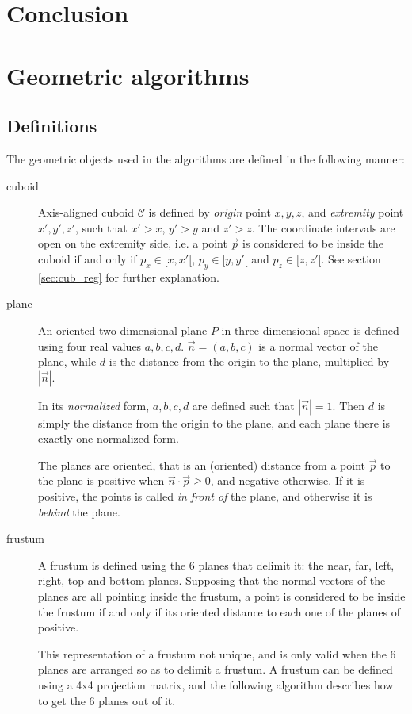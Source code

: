 \documentclass[a4paper,10pt,abstracton,notitlepage]{scrreprt}
\begin{document}
\chapter{Conclusion}

\appendix
\chapter{Geometric algorithms}

\section{Definitions}
The geometric objects used in the algorithms are defined in the following manner:
\begin{description}
\item[cuboid] Axis-aligned cuboid $\mathcal{C}$ is defined by \emph{origin} point $x, y, z$, and \emph{extremity} point $x', y', z'$, such that $x' > x$, $y' > y$ and $z' > z$. The coordinate intervals are open on the extremity side, i.e. a point $\overrightarrow{p}$ is considered to be inside the cuboid if and only if $p_{x} \in [x, x'[$, $p_{y} \in [y, y'[$ and $p_{z} \in [z, z'[$. See section \ref{sec:cub_reg} for further explanation.

\item[plane] An oriented two-dimensional plane $P$ in three-dimensional space is defined using four real values $a, b, c, d$. $\overrightarrow{n} = (a, b, c)$ is a normal vector of the plane, while $d$ is the distance from the origin to the plane, multiplied by $|\overrightarrow{n}|$.

In its \emph{normalized} form, $a, b, c, d$ are defined such that $|\overrightarrow{n}| = 1$. Then $d$ is simply the distance from the origin to the plane, and each plane there is exactly one normalized form.

The planes are oriented, that is an (oriented) distance from a point $\overrightarrow{p}$ to the plane is positive when $\overrightarrow{n} \cdot \overrightarrow{p} \geq 0$, and negative otherwise. If it is positive, the points is called \emph{in front of} the plane, and otherwise it is \emph{behind} the plane.

\item[frustum] A frustum is defined using the 6 planes that delimit it: the near, far, left, right, top and bottom planes. Supposing that the normal vectors of the planes are all pointing inside the frustum, a point is considered to be inside the frustum if and only if its oriented distance to each one of the planes of positive.

This representation of a frustum not unique, and is only valid when the 6 planes are arranged so as to delimit a frustum. A frustum can be defined using a 4x4 projection matrix, and the following algorithm describes how to get the 6 planes out of it.
\end{description}
\end{document}
